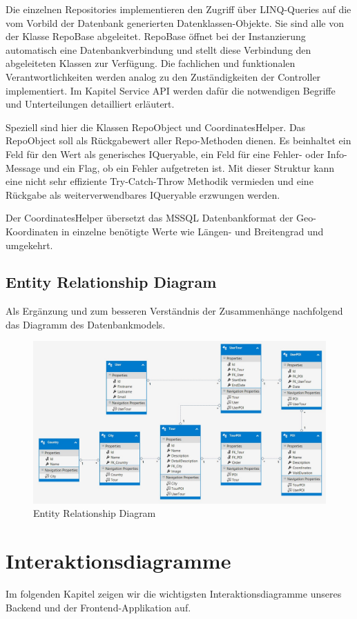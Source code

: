 \documentclass[a4paper,10pt,xetex]{article}
\begin{document}
Die einzelnen Repositories implementieren den Zugriff \"uber LINQ-Queries auf die vom Vorbild der Datenbank generierten
Datenklassen\--Objekte. Sie sind alle von der Klasse RepoBase abgeleitet. RepoBase \"offnet bei der Instanzierung
automatisch eine Datenbankverbindung und stellt diese Verbindung den abgeleiteten Klassen zur Verf\"ugung. Die fachlichen und
funktionalen Verantwortlichkeiten werden analog zu den Zust\"andigkeiten der Controller implementiert. Im Kapitel
Service API werden daf\"ur die notwendigen Begriffe und Unterteilungen detailliert erl\"autert.

Speziell sind hier die Klassen RepoObject und CoordinatesHelper. Das RepoObject soll als R\"uckgabewert aller
Repo-Methoden dienen. Es beinhaltet ein Feld f\"ur den Wert als generisches IQueryable, ein Feld f\"ur eine Fehler-
oder Info-Message und ein Flag, ob ein Fehler aufgetreten ist. Mit dieser Struktur kann eine nicht sehr effiziente
Try-Catch-Throw Methodik vermieden und eine R\"uckgabe als weiterverwendbares IQueryable erzwungen werden.

Der CoordinatesHelper \"ubersetzt das MSSQL Datenbankformat der Geo-Koordinaten in einzelne ben\"otigte Werte wie
L\"angen- und Breitengrad und umgekehrt.

\subsection{Entity Relationship Diagram}\label{erm}
Als Erg\"anzung und zum besseren Verst\"andnis der Zusammenh\"ange nachfolgend das Diagramm des Datenbankmodels.

\begin{figure}
  \centering
  \includegraphics{erm}
  \caption{Entity Relationship Diagram}
\end{figure}

\section{Interaktionsdiagramme}\label{interaktionsdiagramme}
Im folgenden Kapitel zeigen wir die wichtigsten Interaktionsdiagramme unseres Backend und der Frontend-Applikation auf.
\end{document}
